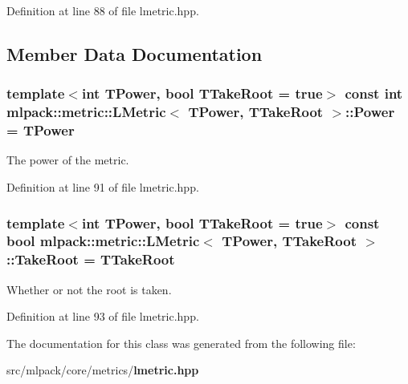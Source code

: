 Definition at line 88 of file lmetric.\+hpp.



\subsection{Member Data Documentation}
\subsubsection[{Power}]{\setlength{\rightskip}{0pt plus 5cm}template$<$int T\+Power, bool T\+Take\+Root = true$>$ const int {\bf mlpack\+::metric\+::\+L\+Metric}$<$ T\+Power, T\+Take\+Root $>$\+::Power = T\+Power\hspace{0.3cm}{\ttfamily [static]}}\label{classmlpack_1_1metric_1_1LMetric_a069e1dc018315ab1eb5be08e153221c3}


The power of the metric. 



Definition at line 91 of file lmetric.\+hpp.

\subsubsection[{Take\+Root}]{\setlength{\rightskip}{0pt plus 5cm}template$<$int T\+Power, bool T\+Take\+Root = true$>$ const bool {\bf mlpack\+::metric\+::\+L\+Metric}$<$ T\+Power, T\+Take\+Root $>$\+::Take\+Root = T\+Take\+Root\hspace{0.3cm}{\ttfamily [static]}}\label{classmlpack_1_1metric_1_1LMetric_af3775490c1d930cf45d660d8052ee6db}


Whether or not the root is taken. 



Definition at line 93 of file lmetric.\+hpp.



The documentation for this class was generated from the following file\+:\begin{DoxyCompactItemize}
\item 
src/mlpack/core/metrics/{\bf lmetric.\+hpp}\end{DoxyCompactItemize}
